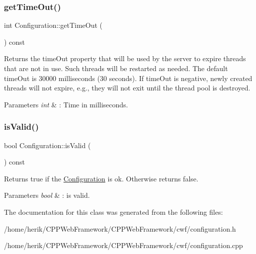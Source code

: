 \subsubsection{\texorpdfstring{get\+Time\+Out()}{getTimeOut()}}
{\footnotesize\ttfamily int Configuration\+::get\+Time\+Out (\begin{DoxyParamCaption}{ }\end{DoxyParamCaption}) const\hspace{0.3cm}{\ttfamily [inline]}}



Returns the time\+Out property that will be used by the server to expire threads that are not in use. Such threads will be restarted as needed. The default time\+Out is 30000 milliseconds (30 seconds). If time\+Out is negative, newly created threads will not expire, e.\+g., they will not exit until the thread pool is destroyed. 


\begin{DoxyParams}{Parameters}
{\em int} & \+: Time in milliseconds. \\
\hline
\end{DoxyParams}
\mbox{\label{class_configuration_add18df7f4c8d8ee3f5ba9cf4b164345d}} 
\subsubsection{\texorpdfstring{is\+Valid()}{isValid()}}
{\footnotesize\ttfamily bool Configuration\+::is\+Valid (\begin{DoxyParamCaption}{ }\end{DoxyParamCaption}) const\hspace{0.3cm}{\ttfamily [inline]}}



Returns true if the \hyperlink{class_configuration}{Configuration} is ok. Otherwise returns false. 


\begin{DoxyParams}{Parameters}
{\em bool} & \+: is valid. \\
\hline
\end{DoxyParams}


The documentation for this class was generated from the following files\+:\begin{DoxyCompactItemize}
\item 
/home/herik/\+C\+P\+P\+Web\+Framework/\+C\+P\+P\+Web\+Framework/cwf/configuration.\+h\item 
/home/herik/\+C\+P\+P\+Web\+Framework/\+C\+P\+P\+Web\+Framework/cwf/configuration.\+cpp\end{DoxyCompactItemize}

